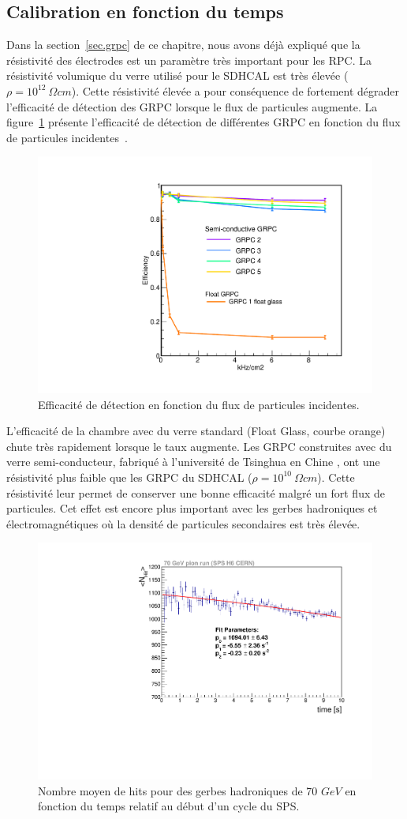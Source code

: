 \subsection{Calibration en fonction du temps}
\label{sec.timeCalib}
Dans la section~\ref{sec.grpc} de ce chapitre, nous avons déjà expliqué que la résistivité des électrodes est un paramètre très important pour les RPC. La résistivité volumique du verre utilisé pour le SDHCAL est très élevée ($\rho=10^{12}~\Omega cm$). Cette résistivité élevée a pour conséquence de fortement dégrader l'efficacité de détection des GRPC lorsque le flux de particules augmente. La figure~\ref{fig:eff_vs_rate} présente l'efficacité de détection de différentes GRPC en fonction du flux de particules incidentes~\cite{haddad}. 
\begin{figure}[!ht]
  \begin{center}
    \includegraphics[width=.6\textwidth]{SDHCAL/figs/EFFRate.pdf}
    \caption{Efficacité de détection en fonction du flux de particules incidentes.}
    \label{fig:eff_vs_rate}
  \end{center}
\end{figure}
L'efficacité de la chambre avec du verre standard (Float Glass, courbe orange) chute très rapidement lorsque le taux augmente. Les GRPC construites avec du verre semi-conducteur, fabriqué à l'université de Tsinghua en Chine \cite{yi_wang}, ont une résistivité plus faible que les GRPC du SDHCAL ($\rho=10^{10}~\Omega cm$). Cette résistivité leur permet de conserver une bonne efficacité malgré un fort flux de particules.
Cet effet est encore plus important avec les gerbes hadroniques et électromagnétiques où la densité de particules secondaires est très élevée.
\begin{figure}[!ht]
  \begin{center}
    \includegraphics[width=.7\textwidth]{SDHCAL/figs/timeCalib70.pdf}
    \caption{Nombre moyen de hits pour des gerbes hadroniques de 70 $GeV$ en fonction du temps relatif au début d'un cycle du SPS.}
    \label{fig:time_correction}
  \end{center}
\end{figure}
